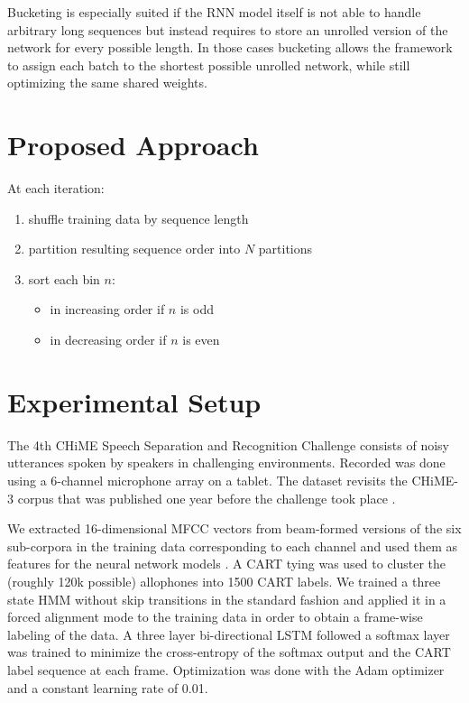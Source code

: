\documentclass{article}
\begin{document}
  Bucketing is especially suited if the RNN model itself is not able to handle arbitrary 
  long sequences but instead requires to store an unrolled version of the network for every possible 
  length. In those cases bucketing allows the framework to assign each batch to the shortest possible 
  unrolled network, while still optimizing the same shared weights.

  \section{Proposed Approach} \label{sec:approach}
 
  At each iteration:
  \begin{enumerate}
  	\item shuffle training data by sequence length
  	\item partition resulting sequence order into $N$ partitions
  	\item sort each bin $n$:
  	\begin{itemize}
  		\item in increasing order if $n$ is odd
  		\item in decreasing order if $n$ is even
  	\end{itemize}
  \end{enumerate}

  \section{Experimental Setup} \label{sec:setup}
  The 4th CHiME Speech Separation and Recognition Challenge
  \cite{Vincent_CSL2016:CHiME4} consists of noisy utterances spoken by speakers in challenging 
  environments. Recorded was done using a 6-channel microphone array on a tablet. The dataset revisits 
  the CHiME-3 corpus that was published one year before the challenge took place \cite{Barker2015:CHiME3}.
  
  We extracted 16-dimensional MFCC vectors from beam-formed versions of the six sub-corpora in the training data corresponding to each channel
  and used them as features for the neural network models \cite{menne16:chime4System}.
  A CART tying was used to cluster the (roughly 120k possible) allophones into 1500 CART labels.
  We trained a three state HMM without skip transitions in the standard fashion and applied it in a forced alignment mode to the training data in order to obtain a frame-wise labeling of the data. A three layer 
  bi-directional LSTM followed a softmax layer was trained to minimize the cross-entropy of the softmax output and the CART label sequence at each frame. Optimization was done with the Adam optimizer and a constant learning rate of 0.01.
  
\end{document}
